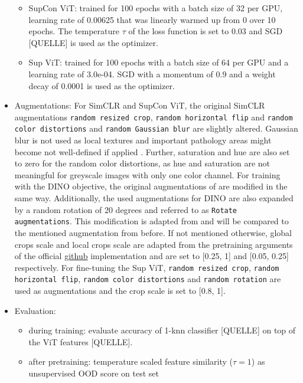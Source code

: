 \begin{itemize}
\begin{itemize}
			\item SupCon ViT: trained for 100 epochs with a batch size of 32 per GPU, learning rate of 0.00625 that was linearly warmed up from 0 over 10 epochs.
			The temperature $\tau$ of the loss function is set to 0.03 and SGD [QUELLE] is used as the optimizer.
		\end{itemize}
		\begin{itemize}
			\item Sup ViT: trained for 100 epochs with a batch size of 64 per GPU and a learning rate of 3.0e-04. SGD with a momentum of 0.9 and a weight decay of 0.0001 is used as the optimizer.
		\end{itemize}
			\item Augmentations: For SimCLR and SupCon ViT, the original SimCLR augmentations \texttt{random resized crop}, \texttt{random horizontal flip} and \texttt{random color distortions}
			and \texttt{random Gaussian blur} are slightly altered.
			Gaussian blur is not used as local textures and important pathology areas might become not well-defined if applied \citep{Azizi2021}.
			Further, saturation and hue are also set to zero for the random color distortions, as hue and saturation are not meaningful for greyscale images with only one color channel. 
			For training with the DINO objective, the original augmentations of \citep{Caron2021} are modified in the same way.
			Additionally, the used augmentations for DINO are also expanded by a random rotation of 20 degrees and referred to as \texttt{Rotate augmentations}. 
			This modification is adapted from \citep{Azizi2021} and will be compared to the mentioned augmentation from before.
			If not mentioned otherwise, global crops scale and local crops scale are adapted from the pretraining arguments of the official \href{https://github.com/facebookresearch/dino#pretrained-models}{github} implementation and are set to [0.25, 1] and [0.05, 0.25] respectively. 
			For fine-tuning the Sup ViT, \texttt{random resized crop}, \texttt{random horizontal flip}, \texttt{random color distortions} and \texttt{random rotation} are used as augmentations and the crop scale is set to [0.8, 1].
	\item Evaluation: 
	\begin{itemize}
		\item during training: evaluate accuracy of 1-knn classifier [QUELLE] on top of the ViT features [QUELLE].
	\end{itemize}
	\begin{itemize}
		\item after pretraining: temperature scaled feature similarity ($\tau=1$) as unsupervised OOD score on test set

\end{itemize}
\end{itemize}
